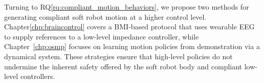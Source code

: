 
Turning to \gls{RQ}\ref{rq:compliant_motion_behaviors}, we propose two methods for generating compliant soft robot motion at a higher control level. Chapter\ref{chp:braincontrol} covers a \gls{BMI}-based protocol that uses wearable \gls{EEG} to supply references to a low-level impedance controller, while Chapter~\ref{chp:osmp} focuses on learning motion policies from demonstration via a dynamical system. These strategies ensure that high-level policies do not undermine the inherent safety offered by the soft robot body and compliant low-level controllers.


